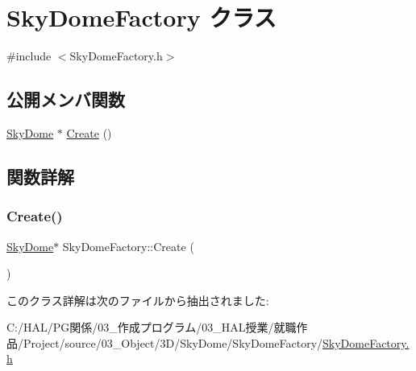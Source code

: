 \hypertarget{class_sky_dome_factory}{}\section{Sky\+Dome\+Factory クラス}
\label{class_sky_dome_factory}


{\ttfamily \#include $<$Sky\+Dome\+Factory.\+h$>$}

\subsection*{公開メンバ関数}
\begin{DoxyCompactItemize}
\item 
\mbox{\hyperlink{class_sky_dome}{Sky\+Dome}} $\ast$ \mbox{\hyperlink{class_sky_dome_factory_a70f27fa64d7cbd5164fc44de566a1683}{Create}} ()
\end{DoxyCompactItemize}


\subsection{関数詳解}
\mbox{\label{class_sky_dome_factory_a70f27fa64d7cbd5164fc44de566a1683}} 
\subsubsection{\texorpdfstring{Create()}{Create()}}
{\footnotesize\ttfamily \mbox{\hyperlink{class_sky_dome}{Sky\+Dome}}$\ast$ Sky\+Dome\+Factory\+::\+Create (\begin{DoxyParamCaption}{ }\end{DoxyParamCaption})\hspace{0.3cm}{\ttfamily [inline]}}



このクラス詳解は次のファイルから抽出されました\+:\begin{DoxyCompactItemize}
\item 
C\+:/\+H\+A\+L/\+P\+G関係/03\+\_\+作成プログラム/03\+\_\+\+H\+A\+L授業/就職作品/\+Project/source/03\+\_\+\+Object/3\+D/\+Sky\+Dome/\+Sky\+Dome\+Factory/\mbox{\hyperlink{_sky_dome_factory_8h}{Sky\+Dome\+Factory.\+h}}\end{DoxyCompactItemize}
